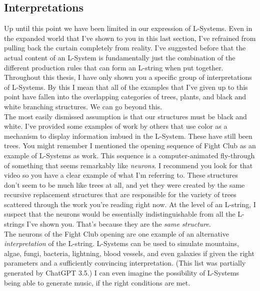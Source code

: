 \documentclass[12pt,twoside]{reedthesis}
\begin{document}
	\subsection{Interpretations}
	Up until this point we have been limited in our expression of L-Systems. Even in the expanded world that I've shown to you in this last section, I've refrained from pulling back the curtain completely from reality. I've suggested before that the actual content of an L-System is fundamentally just the combination of the different production rules that can form an L-string when put together. Throughout this thesis, I have only shown you a specific group of interpretations of L-Systems. By this I mean that all of the examples that I've given up to this point have fallen into the overlapping categories of trees, plants, and black and white branching structures. We can go beyond this.\\
	
	The most easily dismissed assumption is that our structures must be black and white. I've provided some examples of work by others that use color as a mechanism to display information imbued in the L-System. These have still been trees. You might remember I mentioned the opening sequence of Fight Club as an example of L-Systems as work. This sequence is a computer-animated fly-through of something that seems remarkably like \textit{neurons}. I recommend you look for that video so you have a clear example of what I'm referring to. These structures don't seem to be much like trees at all, and yet they were created by the same recursive replacement structures that are responsible for the variety of trees scattered through the work you're reading right now. At the level of an L-string, I suspect that the neurons would be essentially indistinguishable from all the L-strings I've shown you. That's because they are the \textit{same structure}.\\
	
	The neurons of the Fight Club opening are one example of an alternative \textit{interpretation} of the L-string. L-Systems can be used to simulate mountains, algae, fungi, bacteria, lightning, blood vessels, and even galaxies if given the right parameters and a sufficiently convincing interpretation. (This list was partially generated by ChatGPT 3.5.) I can even imagine the possibility of L-Systems being able to generate music, if the right conditions are met.\\
	
\end{document}
